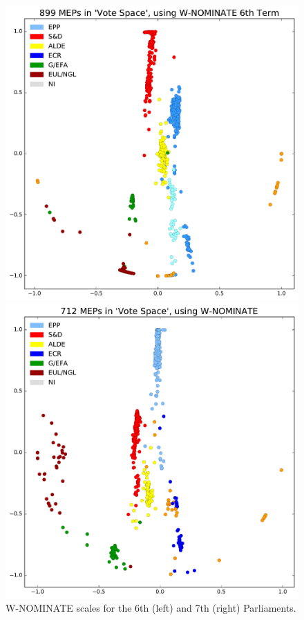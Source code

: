 \documentclass{llncs}
\begin{document}
\begin{figure}[!h]
    \centering
    \begin{minipage}{0.5\textwidth}
        \centering
        \includegraphics[width=1.0\textwidth]{figures/W-NOMINATE-6th.pdf}
    \end{minipage}%
    \begin{minipage}{0.5\textwidth}
        \centering
        \includegraphics[width=1.0\textwidth]{figures/W-NOMINATE-7th.pdf}
    \end{minipage}
    \caption{W-NOMINATE scales for the 6th (left) and 7th (right) Parliaments.}\label{fig:wn}
\end{figure}
\end{document}
